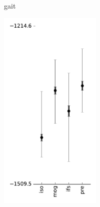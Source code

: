 \documentclass[reprint,amsmath,amssymb,aps,prl]{revtex4-1}
\begin{document}
\begin{figure}[tbh]
\begin{subfigure}{0.49\linewidth}
\begin{subfigure}{\linewidth}
\begin{subfigure}{0.31\linewidth}
			gait
		\end{subfigure} 		
		\begin{subfigure}{0.31\linewidth}  
			\includegraphics[width=\linewidth]{../img/galaxies/likelihoods.pdf}\\

\end{subfigure}
\end{subfigure}
\end{subfigure}
\end{figure}
\end{document}
